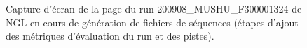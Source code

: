 \begin{figure}[H]
    \centering
    \caption{\footnotesize{Capture d'écran de la page du run 200908\_MUSHU\_F300001324 de NGL en cours de génération de fichiers de séquences (étapes d'ajout des métriques d'évaluation du run et des pistes).}}
    \label{NGL-screenshot_run-lane}
\end{figure}

